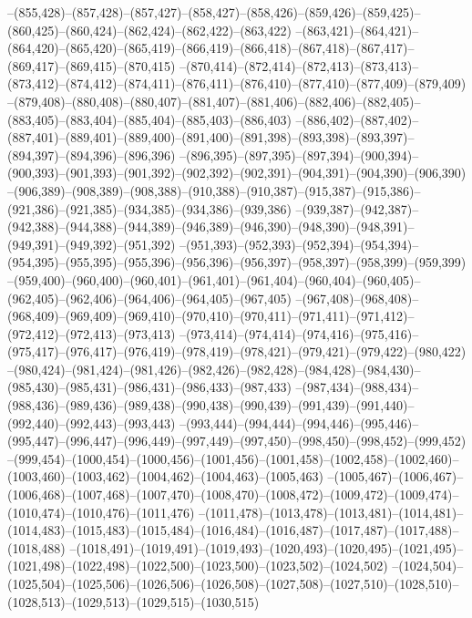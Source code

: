 --(855,428)--(857,428)--(857,427)--(858,427)--(858,426)--(859,426)--(859,425)--(860,425)--(860,424)--(862,424)--(862,422)--(863,422)
--(863,421)--(864,421)--(864,420)--(865,420)--(865,419)--(866,419)--(866,418)--(867,418)--(867,417)--(869,417)--(869,415)--(870,415)
--(870,414)--(872,414)--(872,413)--(873,413)--(873,412)--(874,412)--(874,411)--(876,411)--(876,410)--(877,410)--(877,409)--(879,409)
--(879,408)--(880,408)--(880,407)--(881,407)--(881,406)--(882,406)--(882,405)--(883,405)--(883,404)--(885,404)--(885,403)--(886,403)
--(886,402)--(887,402)--(887,401)--(889,401)--(889,400)--(891,400)--(891,398)--(893,398)--(893,397)--(894,397)--(894,396)--(896,396)
--(896,395)--(897,395)--(897,394)--(900,394)--(900,393)--(901,393)--(901,392)--(902,392)--(902,391)--(904,391)--(904,390)--(906,390)
--(906,389)--(908,389)--(908,388)--(910,388)--(910,387)--(915,387)--(915,386)--(921,386)--(921,385)--(934,385)--(934,386)--(939,386)
--(939,387)--(942,387)--(942,388)--(944,388)--(944,389)--(946,389)--(946,390)--(948,390)--(948,391)--(949,391)--(949,392)--(951,392)
--(951,393)--(952,393)--(952,394)--(954,394)--(954,395)--(955,395)--(955,396)--(956,396)--(956,397)--(958,397)--(958,399)--(959,399)
--(959,400)--(960,400)--(960,401)--(961,401)--(961,404)--(960,404)--(960,405)--(962,405)--(962,406)--(964,406)--(964,405)--(967,405)
--(967,408)--(968,408)--(968,409)--(969,409)--(969,410)--(970,410)--(970,411)--(971,411)--(971,412)--(972,412)--(972,413)--(973,413)
--(973,414)--(974,414)--(974,416)--(975,416)--(975,417)--(976,417)--(976,419)--(978,419)--(978,421)--(979,421)--(979,422)--(980,422)
--(980,424)--(981,424)--(981,426)--(982,426)--(982,428)--(984,428)--(984,430)--(985,430)--(985,431)--(986,431)--(986,433)--(987,433)
--(987,434)--(988,434)--(988,436)--(989,436)--(989,438)--(990,438)--(990,439)--(991,439)--(991,440)--(992,440)--(992,443)--(993,443)
--(993,444)--(994,444)--(994,446)--(995,446)--(995,447)--(996,447)--(996,449)--(997,449)--(997,450)--(998,450)--(998,452)--(999,452)
--(999,454)--(1000,454)--(1000,456)--(1001,456)--(1001,458)--(1002,458)--(1002,460)--(1003,460)--(1003,462)--(1004,462)--(1004,463)--(1005,463)
--(1005,467)--(1006,467)--(1006,468)--(1007,468)--(1007,470)--(1008,470)--(1008,472)--(1009,472)--(1009,474)--(1010,474)--(1010,476)--(1011,476)
--(1011,478)--(1013,478)--(1013,481)--(1014,481)--(1014,483)--(1015,483)--(1015,484)--(1016,484)--(1016,487)--(1017,487)--(1017,488)--(1018,488)
--(1018,491)--(1019,491)--(1019,493)--(1020,493)--(1020,495)--(1021,495)--(1021,498)--(1022,498)--(1022,500)--(1023,500)--(1023,502)--(1024,502)
--(1024,504)--(1025,504)--(1025,506)--(1026,506)--(1026,508)--(1027,508)--(1027,510)--(1028,510)--(1028,513)--(1029,513)--(1029,515)--(1030,515)
